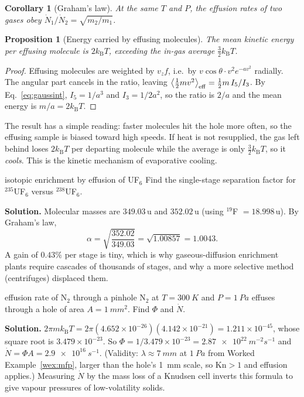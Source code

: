 \documentclass[11pt,a4paper]{report}
\theoremstyle{definition}
\theoremstyle{plain}
\newtheorem{proposition}[definition]{Proposition}
\newtheorem{corollary}[definition]{Corollary}
\newcommand{\kB}{k_{\mathrm{B}}}
\newcommand{\avg}[1]{\left\langle #1\right\rangle}
\begin{document}
\begin{corollary}[Graham's law]
At the same $T$ and $P$, the effusion rates of two gases obey $\dot N_1/\dot N_2=\sqrt{m_2/m_1}$.
\end{corollary}

\begin{proposition}[Energy carried by effusing molecules]\label{prop:effE}
The mean kinetic energy per effusing molecule is $2\kB T$, exceeding the in-gas average $\tfrac32\kB T$.
\end{proposition}
\begin{proof}
Effusing molecules are weighted by $v_zf$, i.e.\ by $v\cos\theta\cdot v^2e^{-av^2}$ radially. The angular part cancels in the ratio, leaving $\avg{\tfrac12mv^2}_{\rm eff}=\tfrac12m\,I_5/I_3$. By Eq.~\eqref{eq:gaussint}, $I_5=1/a^3$ and $I_3=1/2a^2$, so the ratio is $2/a$ and the mean energy is $m/a=2\kB T$.
\end{proof}

The result has a simple reading: faster molecules hit the hole more often, so the effusing sample is biased toward high speeds. If heat is not resupplied, the gas left behind loses $2\kB T$ per departing molecule while the average is only $\tfrac32\kB T$, so it \emph{cools}. This is the kinetic mechanism of evaporative cooling.

\begin{workedex}{isotopic enrichment by effusion of UF$_6$}
Find the single-stage separation factor for $^{235}$UF$_6$ versus $^{238}$UF$_6$.

\medskip\noindent\textbf{Solution.} Molecular masses are $349.03\,\mathrm{u}$ and $352.02\,\mathrm{u}$ (using $^{19}$F $=18.998\,\mathrm u$). By Graham's law,
\[
\alpha=\sqrt{\frac{352.02}{349.03}}=\sqrt{1.00857}=1.0043 .
\]
A gain of $0.43\%$ per stage is tiny, which is why gaseous-diffusion enrichment plants require cascades of thousands of stages, and why a more selective method (centrifuges) displaced them.
\end{workedex}

\begin{workedex}{effusion rate of N$_2$ through a pinhole}
N$_2$ at $T=\SI{300}{K}$ and $P=\SI{1}{Pa}$ effuses through a hole of area $A=\SI{1}{mm^2}$. Find $\Phi$ and $\dot N$.

\medskip\noindent\textbf{Solution.} $2\pi m\kB T=2\pi(4.652\times10^{-26})(4.142\times10^{-21})=1.211\times10^{-45}$, whose square root is $3.479\times10^{-23}$. So $\Phi=1/3.479\times10^{-23}=\SI{2.87e22}{m^{-2}s^{-1}}$ and $\dot N=\Phi A=\SI{2.9e16}{s^{-1}}$. (Validity: $\lambda\approx\SI{7}{mm}$ at $\SI{1}{Pa}$ from Worked Example~\ref{wex:mfp}, larger than the hole's \SI{1}{mm} scale, so $\mathrm{Kn}>1$ and effusion applies.) Measuring $\dot N$ by the mass loss of a Knudsen cell inverts this formula to give vapour pressures of low-volatility solids.
\end{workedex}
\end{document}
